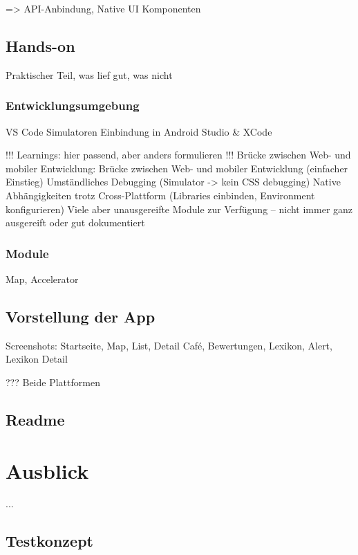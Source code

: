 => API-Anbindung, Native UI Komponenten



\section{Hands-on}
Praktischer Teil, was lief gut, was nicht

\subsection{Entwicklungsumgebung}
VS Code
Simulatoren
Einbindung in Android Studio \& XCode



!!! Learnings: hier passend, aber anders formulieren !!!
Brücke zwischen Web- und mobiler Entwicklung: Brücke zwischen Web- und mobiler Entwicklung (einfacher Einstieg)
Umständliches Debugging (Simulator -> kein CSS debugging)
Native Abhängigkeiten trotz Cross-Plattform (Libraries einbinden, Environment konfigurieren)
Viele aber unausgereifte Module zur Verfügung – nicht immer ganz ausgereift oder gut dokumentiert


\subsection{Module}
Map, Accelerator



\section{Vorstellung der App}
Screenshots: Startseite, Map, List, Detail Café, Bewertungen, Lexikon, Alert, Lexikon Detail

??? Beide Plattformen


\section{Readme}






\chapter{Ausblick}
\label{ausblick}
...


\section{Testkonzept}


